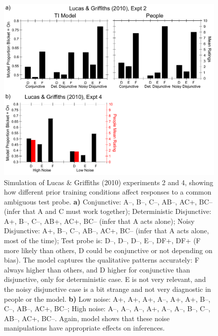\documentclass[11pt,twoside]{article}
\newif\myifpdf
\begin{document}
\begin{figure}
  \centering\includegraphics[width=6in]{figs/fig_blicket_lg10_all}
  \caption{\small Simulation of Lucas \& Griffiths (2010) experiments 2 and 4, showing how different prior training conditions affect responses to a common ambiguous test probe.  {\bf a)} Conjunctive: A--, B--, C--, AB--, AC+, BC-- (infer that A and C must work together); Deterministic Disjunctive: A+, B--, C--, AB+, AC+, BC-- (infer that A acts alone);  Noisy Disjunctive: A+, B--, C--, AB--, AC+, BC-- (infer that A acts alone, most of the time); Test probe is: D--, D--, D--, E--, DF+, DF+ (F more likely than others, D could be conjunctive or not depending on bias).  The model captures the qualitative patterns accurately: F always higher than others, and D higher for conjunctive than disjunctive, only for deterministic case.  E is not very relevant, and the noisy disjunctive case is a bit strange and not very diagnostic in people or the model.  {\bf b)} Low noise: A+, A+, A+, A--, A+, A+, B--, C--, AB--, AC+, BC--; High noise: A--, A--, A--, A+, A--, A--, B--, C--, AB--, AC+, BC--.  Again, model shows that these noise manipulations have appropriate effects on inferences.}
  \label{fig.lg10}
\end{figure}
\end{document}
